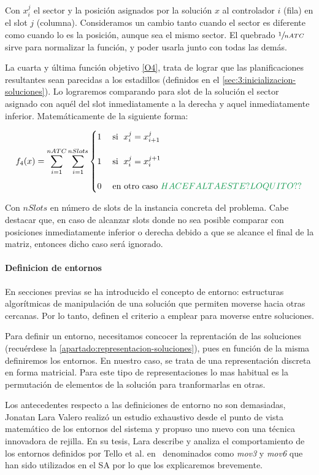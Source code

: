Con $x_i^j$ el sector y la posición asignados por la solución $x$ al controlador $i$ (fila) en el slot $j$ (columna). Consideramos un cambio tanto cuando el sector es diferente como cuando lo es la posición, aunque sea el mismo sector.
El quebrado $\sfrac{1}{nATC}$ sirve para normalizar la función, y poder usarla junto con todas las demás. 

La cuarta y última función objetivo \ref{O4}, trata de lograr que las planificaciones resultantes sean parecidas a los estadillos (definidos en el \autoref{sec:3:inicializacion-soluciones}). Lo lograremos comparando para slot de la solución el sector asignado con aquél del slot inmediatamente a la derecha y aquel inmediatamente inferior. Matemáticamente de la siguiente forma:

\[
	f_4(x) = \sum_{i=1}^{nATC} \sum_{i=1}^{nSlots}
	\begin{cases}
		1 & \; \textrm{si } \; x_i^j = x_{i+1}^{j} \\
													\\
		1 & \; \textrm{si } \; x_i^j = x_{i}^{j+1}   \\
													  \\
		0 & \; \textrm{en otro caso }  \NOTE{HACE FALTA ESTE? LO QUITO??}
	\end{cases}
\]

Con $nSlots$ en número de slots de la instancia concreta del problema. Cabe destacar que, en caso de alcanzar slots
donde no sea posible comparar con posiciones inmediatamente inferior o derecha debido a que se alcance el final de la matriz, entonces dicho caso será ignorado.

\paragraph{Definicion de entornos}
En secciones previas se ha introducido el concepto de entorno: estructuras algorítmicas de manipulación de una solución que permiten moverse hacia otras cercanas. Por lo tanto, definen el criterio a emplear para moverse entre soluciones.

Para definir un entorno, necesitamos concocer la reprentación de las soluciones (recuérdese la \autoref{apartado:representacion-soluciones}), pues en función de la misma definiremos los entornos. En nuestro caso, se trata de una representación discreta en forma matricial. Para este tipo de representaciones lo mas habitual es la permutación de elementos de la solución para tranformarlas en otras.

Los antecedentes respecto a las definiciones de entorno no son demasiadas, Jonatan Lara Valero realizó un estudio exhaustivo desde el punto de vista matemático de los entornos del sistema \legacy{} y propuso uno nuevo con una técnica innovadora de rejilla. En su tesis, Lara describe y analiza el comportamiento de los entornos definidos por Tello et al. en~\cite{articulo1} denominados como \textit{mov3} y \textit{mov6} que han sido utilizados en el SA por lo que los explicaremos brevemente. 

